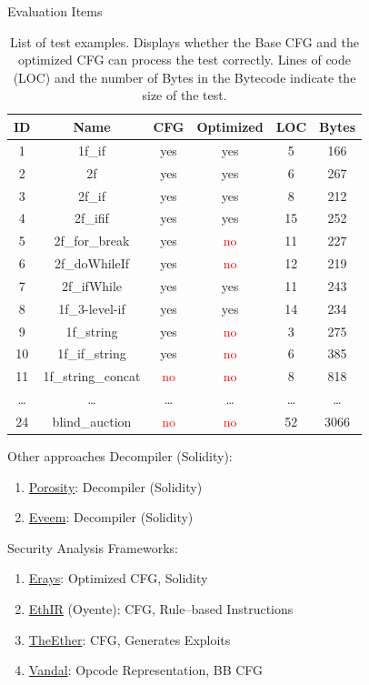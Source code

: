 \documentclass[11pt]{beamer}
\begin{document}
\begin{frame}{Evaluation Items}
    \begin{table}[htb!]
\centering
\begin{tabular}{ | c | c | c | c | c | c | }
\hline
ID & Name & CFG & Optimized & LOC &  Bytes\\
\hline
1 & 1f\_if & yes & yes & 5 & 166\\
2 & 2f & yes & yes & 6 & 267\\
3 & 2f\_if & yes & yes & 8 & 212\\
4 & 2f\_ifif & yes & yes & 15 & 252\\
5 & 2f\_for\_break & yes & \textcolor{red}{no} & 11 & 227\\
6 & 2f\_doWhileIf & yes & \textcolor{red}{no} & 12 & 219\\
7 & 2f\_ifWhile & yes & yes & 11 & 243\\
8 & 1f\_3-level-if & yes & yes & 14 & 234\\
9 & 1f\_string & yes & \textcolor{red}{no} & 3 & 275\\
10 & 1f\_if\_string & yes & \textcolor{red}{no} & 6 & 385\\
11 & 1f\_string\_concat & \textcolor{red}{no} & \textcolor{red}{no} & 8 & 818\\
\ldots & \ldots & \ldots & \ldots & \ldots & \ldots \\
24 & blind\_auction & \textcolor{red}{no} & \textcolor{red}{no} & 52 & 3066\\
\hline
\end{tabular}
\caption{List of test examples. Displays whether the Base CFG and the optimized CFG can process the test correctly. Lines of code (LOC) and the number of Bytes in the Bytecode indicate the size of the test.}
\label{tab:eval}
\end{table}
\end{frame}

\begin{frame}{Other approaches}
Decompiler (Solidity):
    \begin{enumerate}
        \item \href{https://github.com/comaeio/porosity}{Porosity}: Decompiler (Solidity)
        \item \href{https://eveem.org/}{Eveem}: Decompiler (Solidity)
    \end{enumerate}
Security Analysis Frameworks:
    \begin{enumerate}
        \item \href{https://www.usenix.org/system/files/conference/usenixsecurity18/sec18-zhou.pdf}{Erays}: Optimized CFG, Solidity
        \item \href{https://arxiv.org/pdf/1805.07208.pdf}{EthIR} (Oyente): CFG, Rule--based Instructions
        \item \href{https://www.usenix.org/system/files/conference/usenixsecurity18/sec18-krupp.pdf}{TheEther}: CFG, Generates Exploits
        \item \href{https://arxiv.org/pdf/1809.03981.pdf}{Vandal}: Opcode Representation, BB CFG
    \end{enumerate}
\end{frame}
\end{document}
